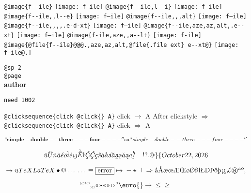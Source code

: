 \documentclass{book}
\renewcommand{\includegraphics}[1]{\fbox{FIG #1}}
\begin{document}
\texttt{@image\{f{-}{-}ile\}} \texttt{[image: f--ile]}
\texttt{@image\{f{-}{-}ile,l{-}{-}i\}} \texttt{[image: f--ile]}
\texttt{@image\{f{-}{-}ile,,l{-}{-}e\}} \texttt{[image: f--ile]}
\texttt{@image\{f{-}{-}ile,,,alt\}} \texttt{[image: f--ile]}
\texttt{@image\{f{-}{-}ile,,,,.e-d-xt\}} \texttt{[image: f--ile]}
\texttt{@image\{f{-}{-}ile,aze,az,alt,.e{-}{-}xt\}} \texttt{[image: f--ile]}
\texttt{@image\{f-ile,aze,,a{-}{-}lt\}} \texttt{[image: f-ile]}
\texttt{@image\{@file\{f{-}{-}ile\}@@@.,aze,az,alt,@file\{.file ext\} e{-}{-}xt@\}} \texttt{[image: f--ile@.]}

\texttt{@sp 2}\leavevmode{}\\
\baselineskip %
\texttt{@page}\leavevmode{}\\
\newpage{}%
\phantom{blabla}%
{\bfseries author}%

\texttt{need 1002}
\needspace{1.002pt}%

\texttt{@clicksequence\{click @click\{\} A\}} click $\rightarrow{}$ A
After clickstyle $\Rightarrow{}$
\texttt{@clicksequence\{click @click\{\} A\}} click $\Rightarrow{}$ A

$$
\mathbf{``simple-double--three---four----''} \hbox{aa}
`\hbox{}`simple-double-\hbox{}-three---four----'\hbox{}'
$$

$$
\ddot{u} \ddot{U} \tilde{n} \hat{a} \acute{e} \bar{o} \grave{i} \acute{e} \imath{} \jmath{} \grave{\bar{E}}
\mathord{\text{\l{}}} \textsl{\c{\'{C}}} \textsl{\c{\'{C}}} \textsl{\c{c}} \textsl{\H{a}} \dot{a} \mathring{a} \textsl{\t{a}}
\breve{a} \textsl{\b{a}} \textsl{\d{a}} \check{a} \textsl{\k{a}} a^{h}_{l}
 \ {}\ {} \ {}\-{}   ! ? . @ \} \{ 
\today{}
$$

$$
\rightarrow{}
u
TeX LaTeX \bullet{} \copyright{} \dots{} \dots{} \equiv{}
\fbox{error} \mapsto{} - \star{} \dashv{} \Rightarrow{}
\mathord{\text{\aa{}}} \mathord{\text{\AA{}}} \mathord{\text{\ae{}}} \mathord{\text{\oe{}}} \mathord{\text{\AE{}}} \mathord{\text{\OE{}}} \mathord{\text{\o{}}} \mathord{\text{\O{}}} \mathord{\text{\ss{}}} \mathord{\text{\l{}}} \mathord{\text{\L{}}} \mathord{\text{\DH{}}}
\mathord{\text{\TH{}}} \mathord{\text{\dh{}}} \mathord{\text{\th{}}} \mathord{\text{\textexclamdown{}}} \mathord{\text{\textquestiondown{}}} \mathsterling{}
\circledR{} \mathord{\text{\textordfeminine{}}} \mathord{\text{\textordmasculine{}}} , 
$$

$$
\mathord{\text{\textquotedblleft{}}} \mathord{\text{\textquotedblright{}}} 
\mathord{\text{\textquoteleft{}}} \mathord{\text{\textquoteright{}}} \mathord{\text{\quotedblbase{}}} \mathord{\text{\quotesinglbase{}}} \mathord{\text{\guillemotleft{}}}
\mathord{\text{\guillemotright{}}} \mathord{\text{\guillemotleft{}}} \mathord{\text{\guillemotright{}}} \mathord{\text{\guilsinglleft{}}}
\mathord{\text{\guilsinglright{}}} ^{\circ{}} \euro{} \rightarrow{} \leq{} \geq{}
$$
\end{document}
